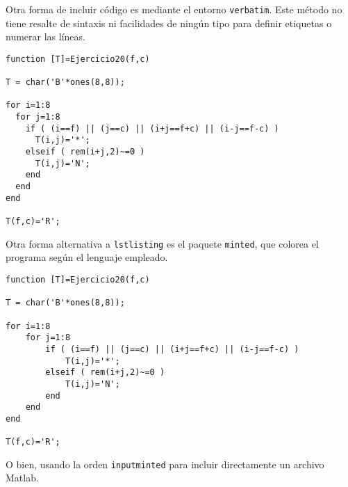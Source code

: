 \noindent Otra forma de incluir código es mediante el entorno \texttt{verbatim}.  Este método no tiene resalte de sintaxis ni facilidades de ningún tipo para definir etiquetas o numerar las líneas. 

\begin{verbatim}
function [T]=Ejercicio20(f,c)

T = char('B'*ones(8,8));

for i=1:8
  for j=1:8
    if ( (i==f) || (j==c) || (i+j==f+c) || (i-j==f-c) )
      T(i,j)='*';
    elseif ( rem(i+j,2)~=0 )
      T(i,j)='N';
    end
  end
end

T(f,c)='R';
\end{verbatim}

\noindent Otra forma alternativa a \texttt{lstlisting} es el paquete \texttt{minted}, que colorea el programa según el lenguaje empleado.


\begin{verbatim}
function [T]=Ejercicio20(f,c)

T = char('B'*ones(8,8));

for i=1:8
    for j=1:8
        if ( (i==f) || (j==c) || (i+j==f+c) || (i-j==f-c) )
            T(i,j)='*';
        elseif ( rem(i+j,2)~=0 )
            T(i,j)='N';
        end
    end
end

T(f,c)='R';
\end{verbatim}

\noindent O bien, usando la orden \texttt{inputminted} para incluir directamente un archivo Matlab.

\inputminted{matlab}{tex/latex/ejercicio20.m}
